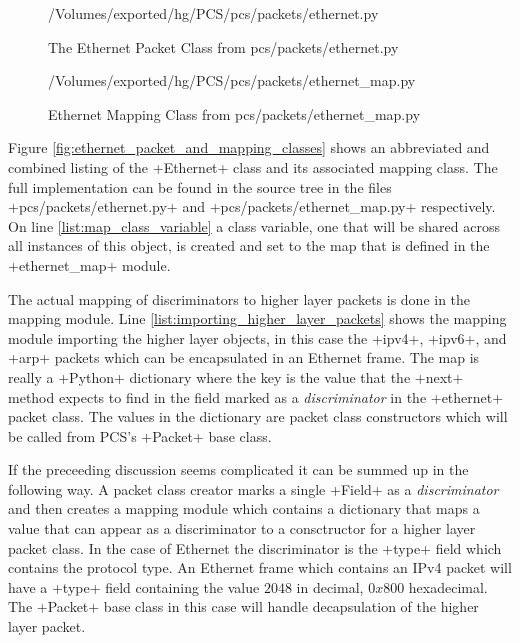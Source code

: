 \documentclass[11pt]{article}
\begin{document}
\begin{figure}
{/Volumes/exported/hg/PCS/pcs/packets/ethernet.py}
  \caption{The Ethernet Packet Class from pcs/packets/ethernet.py}
  \label{fig:ethernet-packet-class}
\end{figure}

\begin{figure}
  {/Volumes/exported/hg/PCS/pcs/packets/ethernet_map.py}
  \caption{Ethernet Mapping Class from pcs/packets/ethernet_map.py}
  \label{fig:ethernet-mapping-class}
\end{figure}

Figure \ref{fig:ethernet_packet_and_mapping_classes} shows an
abbreviated and combined listing of the \class+Ethernet+ class and its
associated mapping class.  The full implementation can be found in the 
source tree in the files \fullpath+pcs/packets/ethernet.py+ and
\fullpath+pcs/packets/ethernet_map.py+ respectively.  On line
\ref{list:map_class_variable} a class variable, one that will be
shared across all instances of this object, is created and set to the
map that is defined in the \class+ethernet_map+ module.

The actual mapping of discriminators to higher layer packets is done
in the mapping module.  Line \ref{list:importing_higher_layer_packets}
shows the mapping module importing the higher layer objects, in this
case the \class+ipv4+, \class+ipv6+, and \class+arp+ packets which can
be encapsulated in an Ethernet frame.  The map is really a
\program+Python+ dictionary where the key is the value that the
\method+next+ method expects to find in the field marked as a
\emph{discriminator} in the \class+ethernet+ packet class.  The values
in the dictionary are packet class constructors which will be called
from PCS's \class+Packet+ base class.

If the preceeding discussion seems complicated it can be summed up in
the following way.  A packet class creator marks a single
\class+Field+ as a \emph{discriminator} and then creates a mapping
module which contains a dictionary that maps a value that can appear
as a discriminator to a consctructor for a higher layer packet class.
In the case of Ethernet the discriminator is the \field+type+ field
which contains the protocol type.  An Ethernet frame which contains an
IPv4 packet will have a \field+type+ field containing the value $2048$
in decimal, $0x800$ hexadecimal.  The \class+Packet+ base class in
this case will handle decapsulation of the higher layer packet.
\end{document}
